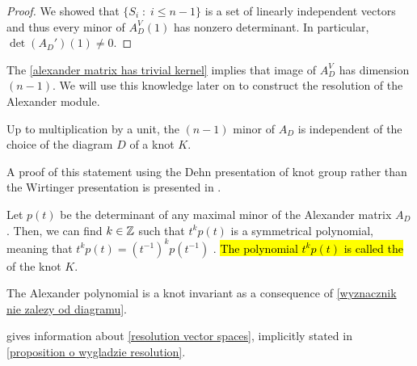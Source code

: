 \begin{proof}
  We showed that $\{S_i\;:\;i\leq n-1\}$ is a set of linearly independent vectors and thus every minor of $A_D^V(1)$ has nonzero determinant. In particular, $\det(A_D')(1)\neq 0$.
\end{proof}

The \cref{alexander matrix has trivial kernel} implies that image of $A_D^V$ has dimension $(n-1)$. We will use this knowledge later on to construct the resolution of the Alexander module.

\begin{theorem}\label{wyznacznik nie zalezy od diagramu}
  Up to multiplication by a unit, the $(n-1)$ minor of $A_D$ is independent of the choice of the diagram $D$ of a knot $K$.
\end{theorem}

A proof of this statement using the Dehn presentation of knot group rather than the Wirtinger presentation is presented in \cite{alex-oryginal}.

\begin{definition}
  Let $p(t)$ be the determinant of any maximal minor of the Alexander matrix $A_D$. Then, we can find $k\in\operatorname{\mathbb{Z}}$ such that $t^kp(t)$ is a symmetrical polynomial, meaning that $t^kp(t)=(t^{-1})^kp(t^{-1})$ \cite{alex-oryginal}.
  \hl{The polynomial $t^kp(t)$ is called the } of the knot $K$.
\end{definition}

The Alexander polynomial is a knot invariant as a consequence of \cref{wyznacznik nie zalezy od diagramu}.

 gives information about \eqref{resolution vector spaces}, implicitly stated in \cref{proposition o wygladzie resolution}.

